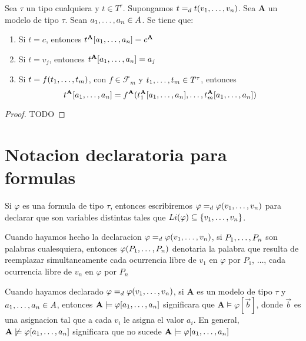 \begin{lemma}
  Sea $\tau$ un tipo cualquiera y $t \in T^\tau$. Supongamos $t =_d t(v_{1}, \dots, v_{n})$. Sea
  $\mathbf{A}$ un modelo de tipo $\tau$. Sean $a_{1}, \dots, a_{n} \in A$. Se tiene que: \begin{enumerate}
    \item Si $t = c$, entonces $t^\mathbf{A}[a_{1}, \dots, a_{n}] = c^\mathbf{A}$
    \item Si $t = v_j$, entonces $t^\mathbf{A}[a_{1}, \dots, a_{n}] = a_j$
    \item Si $t = f(t_{1}, \dots, t_{m})$, con $f \in \mathcal{F}_m$ y $t_{1}, \dots, t_{m} \in T^\tau$, entonces
    $$
    t^\mathbf{A}[a_{1}, \dots, a_{n}] = f^\mathbf{A}(t_1^\mathbf{A}[a_{1}, \dots, a_{n}],\dots, t_m^\mathbf{A}[a_{1}, \dots, a_{n}])
    $$
  \end{enumerate}
\end{lemma}
\begin{proof}
  TODO
\end{proof}

\section{Notacion declaratoria para formulas}
\begin{definition}
  Si $\varphi$ es una formula de tipo $\tau$, entonces escribiremos $\varphi =_d \varphi(v_{1}, \dots, v_{n})$ para 
  declarar que  son variables distintas tales que $Li(\varphi) \subseteq \{v_{1}, \dots, v_{n}\}$.
\end{definition}

\begin{convention}
  Cuando hayamos hecho la declaracion $\varphi =_d \varphi(v_{1}, \dots, v_{n})$, si $P_{1}, \dots, P_{n}$ son palabras 
  cualesquiera, entonces $\varphi(P_{1}, \dots, P_{n})$ denotaria la palabra que resulta de 
  reemplazar simultaneamente cada ocurrencia libre de $v_1$ en $\varphi$ por $P_1$, $\dots$, cada ocurrencia libre de $v_n$
  en $\varphi$ por $P_n$ 
\end{convention}

\begin{convention}
  Cuando hayamos declarado $\varphi =_d \varphi(v_{1}, \dots, v_{n})$, si $\mathbf{A}$ es un modelo 
  de tipo $\tau$ y $a_{1}, \dots, a_{n} \in A$, entonces $\mathbf{A} \models \varphi[a_{1}, \dots, a_{n}]$
  significara que $\mathbf{A}\models\varphi[\vec{b}]$, donde $\vec{b}$ es una asignacion tal que a 
  cada $v_i$ le asigna el valor $a_i$. En general, $\mathbf{A}\not\models\varphi[a_{1}, \dots, a_{n}]$ significara que
  no sucede $\mathbf{A}\models\varphi[a_{1}, \dots, a_{n}]$
\end{convention}

